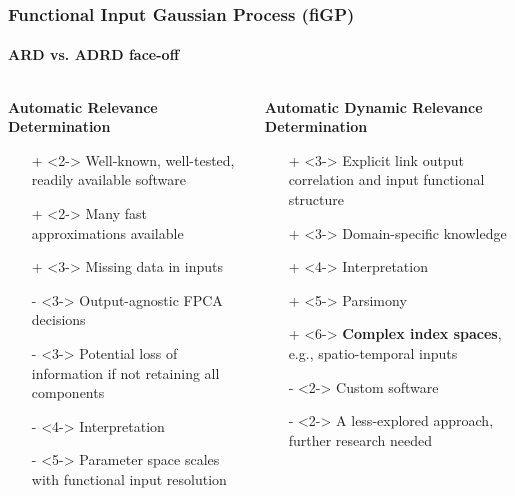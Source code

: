 \documentclass[handout]{snedecorbeamer}
\begin{document}
\begin{frame}
  \frametitle{Functional Input Gaussian Process (fiGP)}
  \framesubtitle{ARD vs. ADRD face-off}

    \begin{columns}[t]
    \begin{column}{.45\textwidth}
      {\footnotesize\bfseries Automatic Relevance Determination}
      \begin{itemize}
      \item[+]<2-> Well-known, well-tested, readily available software
      \item[+]<2-> Many fast approximations available
      \item[+]<3-> Missing data in inputs
      \end{itemize}
      \vspace{0.25cm}
      \begin{itemize}
      \item[-]<3-> Output-agnostic FPCA decisions%
      \item[-]<3-> Potential loss of information if not retaining all
        components
      \item[-]<4-> Interpretation
      \item[-]<5-> Parameter space scales with
        functional input resolution
      \end{itemize}
    \end{column}

    \begin{column}{.45\textwidth}
      {\footnotesize\bfseries Automatic Dynamic Relevance Determination}
      \begin{itemize}
      \item[+]<3-> Explicit link output correlation and
        input functional structure
      \item[+]<3-> Domain-specific knowledge
      \item[+]<4-> Interpretation
      \item[+]<5-> Parsimony
      \item[+]<6-> \alert{\textbf{Complex index spaces}},
        e.g., spatio-temporal inputs
      \end{itemize}
      \vspace{0.25cm}
      \begin{itemize}
      \item[-]<2-> Custom software
      \item[-]<2-> A less-explored approach, further research needed
      \end{itemize}
    \end{column}
  \end{columns}
\end{frame}
\end{document}
